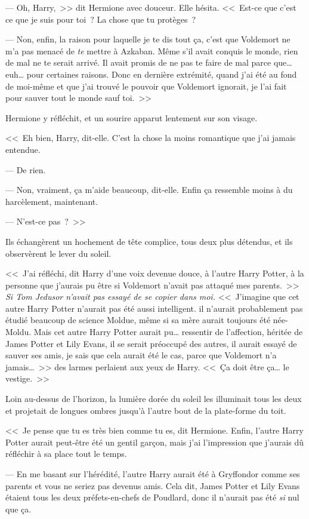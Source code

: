 --- Oh, Harry,~>> dit Hermione avec douceur. Elle hésita. <<~Est-ce que c'est ce que je suis pour toi~? La chose que tu protèges~?

--- Non, enfin, la raison pour laquelle je te dis tout ça, c'est que Voldemort ne m'a pas menacé de \emph{te} mettre à Azkaban. Même s'il avait conquis le monde, rien de mal ne te serait arrivé. Il avait promis de ne pas te faire de mal parce que… euh… pour certaines raisons. Donc en dernière extrémité, quand j'ai été au fond de moi-même et que j'ai trouvé le pouvoir que Voldemort ignorait, je l'ai fait pour sauver tout le monde sauf toi.~>>

Hermione y réfléchit, et un sourire apparut lentement sur son visage.

<<~Eh bien, Harry, dit-elle. C'est la chose la moins romantique que j'ai jamais entendue.

--- De rien.

--- Non, vraiment, ça m'aide beaucoup, dit-elle. Enfin ça ressemble moins à du harcèlement, maintenant.

--- N'est-ce pas~?~>>

Ils échangèrent un hochement de tête complice, tous deux plus détendus, et ils observèrent le lever du soleil.

<<~J'ai réfléchi, dit Harry d'une voix devenue douce, à l'autre Harry Potter, à la personne que j'aurais pu être si Voldemort n'avait pas attaqué mes parents.~>> \emph{Si Tom Jedusor n'avait pas essayé de se copier dans moi.} <<~J'imagine que cet autre Harry Potter n'aurait pas été aussi intelligent. il n'aurait probablement pas étudié beaucoup de science Moldue, même si sa mère aurait toujours été née-Moldu. Mais cet autre Harry Potter aurait pu… ressentir de l'affection, héritée de James Potter et Lily Evans, il se serait préoccupé des autres, il aurait essayé de sauver ses amis, je sais que cela aurait été le cas, parce que Voldemort n'a jamais…~>> des larmes perlaient aux yeux de Harry. <<~Ça doit être ça… le vestige.~>>

Loin au-dessus de l'horizon, la lumière dorée du soleil les illuminait tous les deux et projetait de longues ombres jusqu'à l'autre bout de la plate-forme du toit.

<<~Je pense que tu es très bien comme tu es, dit Hermione. Enfin, l'autre Harry Potter aurait peut-être été un gentil garçon, mais j'ai l'impression que j'aurais dû réfléchir à sa place tout le temps.

--- En me basant sur l'hérédité, l'autre Harry aurait été à Gryffondor comme ses parents et vous ne seriez pas devenus amis. Cela dit, James Potter et Lily Evans étaient tous les deux préfets-en-chefs de Poudlard, donc il n'aurait pas été \emph{si} nul que ça.

